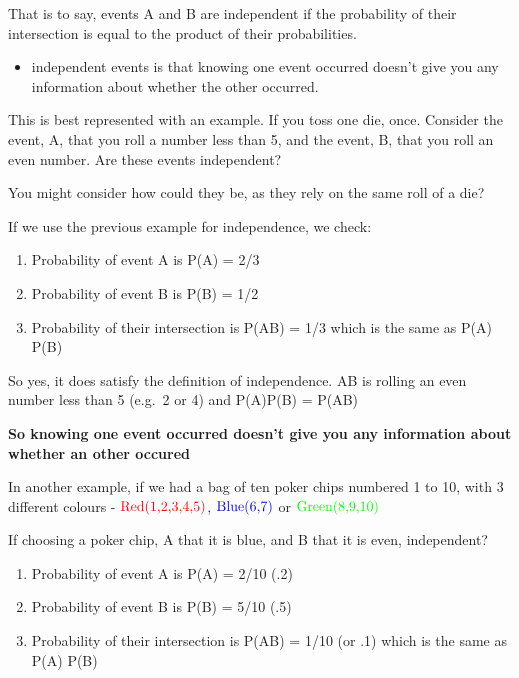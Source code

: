\documentclass[]{book}
\providecommand{\tightlist}{%
  \setlength{\itemsep}{0pt}\setlength{\parskip}{0pt}}
\theoremstyle{definition}
\theoremstyle{definition}
\theoremstyle{definition}
\theoremstyle{remark}
\begin{document}
That is to say, events A and B are independent if the probability of
their intersection is equal to the product of their probabilities.

\begin{itemize}
\tightlist
\item
  independent events is that knowing one event occurred doesn't give you
  any information about whether the other occurred.
\end{itemize}

This is best represented with an example. If you toss one die, once.
Consider the event, A, that you roll a number less than 5, and the
event, B, that you roll an even number. Are these events independent?

You might consider how could they be, as they rely on the same roll of a
die?

If we use the previous example for independence, we check:

\begin{enumerate}
\def\labelenumi{\arabic{enumi}.}
\item
  Probability of event A is P(A) = 2/3
\item
  Probability of event B is P(B) = 1/2
\item
  Probability of their intersection is P(AB) = 1/3 which is the same as
  P(A) P(B)
\end{enumerate}

So yes, it does satisfy the definition of independence. AB is rolling an
even number less than 5 (e.g.~2 or 4) and P(A)P(B) = P(AB)

\textbf{So knowing one event occurred doesn't give you any information
about whether an other occured}

In another example, if we had a bag of ten poker chips numbered 1 to 10,
with 3 different colours - \(\color{red}{\text{Red(1,2,3,4,5)}}\),
\(\color{blue}{\text{Blue(6,7)}}\) or
\(\color{green}{\text{Green(8,9,10)}}\)

If choosing a poker chip, A that it is blue, and B that it is even,
independent?

\begin{enumerate}
\def\labelenumi{\arabic{enumi}.}
\item
  Probability of event A is P(A) = 2/10 (.2)
\item
  Probability of event B is P(B) = 5/10 (.5)
\item
  Probability of their intersection is P(AB) = 1/10 (or .1) which is the
  same as P(A) P(B)
\end{enumerate}
\end{document}
